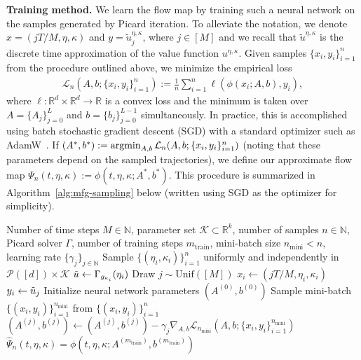 \documentclass[11pt,reqno]{amsart}
\numberwithin{equation}{section}
\theoremstyle{plain}
\newcommand{\R}{\mathbb{R}}
\newcommand{\N}{\mathbb{N}}
\newcommand{\calK}{{\mathcal K}}
\newcommand{\calL}{{\mathcal L}}
\newcommand{\calP}{{\mathcal P}}
\newcommand{\argmin}{\mathop{\rm argmin}}
\newcommand{\1}{\boldsymbol{\mathbbm{1}}}
\begin{document}
\noindent\textbf{Training method.} 
We learn the flow map by training such a neural network on the samples generated by Picard iteration. To alleviate the notation, we denote $x = (jT/M,\eta,\kappa)$ and $y = \tilde{u}^{\eta,\kappa}_j$, where $j \in [M]$ and we recall that $\tilde{u}^{\eta,\kappa}$ is the discrete time approximation of the value function $u^{\eta,\kappa}$.
Given samples $\{x_i, y_i\}_{i = 1}^n$ from the procedure outlined above, we minimize the empirical loss
\begin{align}
\label{eq:emp-loss}
\textstyle
    \calL_n(A, b; \{x_i, y_i\}_{i=1}^n) := \frac{1}{n} \sum_{i = 1}^n \ell(\phi(x_i; A, b), y_i),
\end{align}
where $\ell : \R^d \times \R^d \to \R$ is a convex loss and the minimum is taken over $A = \{A_j\}_{j=0}^L$ and $b = \{b_{j}\}_{j=0}^{L - 1}$ simultaneously. In practice, this is accomplished using batch stochastic gradient descent (SGD) with a standard optimizer such as AdamW~\citep{adamw}. If $(A^*, b^*) := \argmin_{A, b} \calL_n(A, b; \{x_i, y_i\}_{i=1}^n)$ (noting that these parameters depend on the sampled trajectories), we define our approximate flow map $\Psi_n(t, \eta, \kappa) := \phi(t, \eta, \kappa; A^*, b^*)$. This procedure is summarized in Algorithm~\ref{alg:mfg-sampling} below (written using SGD as the optimizer for simplicity).
\begin{algorithm}[h]
\caption{Sampling and Learning Flow Map for a Family of MFGs}\label{alg:mfg-sampling}
\begin{algorithmic}[1]
    \Require Number of time steps $M \in \N$, parameter set $\calK \subset \R^k$, number of samples $n \in \N$, Picard solver $\Gamma$, number of training steps $m_{\mathrm{train}}$, mini-batch size $n_{\mathrm{mini}} < n$, learning rate $\{\gamma_j\}_{j \in \N}$
    \State Sample $\{(\eta_i, \kappa_i)\}_{i=1}^n$ uniformly and independently in $\calP([d]) \times \calK$
     
    \State $\Tilde{u} \gets \Gamma_{g_{\kappa_i}}(\eta_i)$
    \State Draw $j \sim \text{Unif}([M])$
    \State $x_i \gets (j T / M, \eta_i, \kappa_i)$
    \State $y_i \gets \Tilde{u}_j$
    \EndFor
    \State Initialize neural network parameters $(A^{(0)}, b^{(0)})$
     
    \State Sample mini-batch $\{(x_i, y_i)\}_{i=1}^{n_{\mathrm{mini}}}$ from $\{(x_i, y_i)\}_{i=1}^n$
    \State $(A^{(j)}, b^{(j)}) \gets (A^{(j)}, b^{(j)}) - \gamma_j \nabla_{A, b} \calL_{n_{\mathrm{mini}}}(A, b; \{x_i, y_i\}_{i=1}^{n_{\mathrm{mini}}})$ 
    \EndFor
    \State \Return $\widehat{\Psi}_n(t, \eta, \kappa) = \phi(t, \eta, \kappa; A^{(m_{\mathrm{train}})}, b^{(m_{\mathrm{train}})})$
\end{algorithmic}
\end{algorithm}
\end{document}
